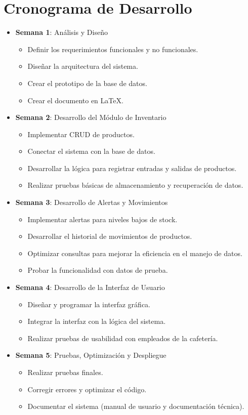 \documentclass{report}
\begin{document}
\section{Cronograma de Desarrollo}
\begin{itemize}
\item \textbf{Semana 1}: Análisis y Diseño
\begin{itemize}
\item Definir los requerimientos funcionales y no funcionales.
\item Diseñar la arquitectura del sistema.
\item Crear el prototipo de la base de datos.
\item Crear el documento en \LaTeX.
\end{itemize}
\item \textbf{Semana 2}: Desarrollo del Módulo de Inventario
\begin{itemize}
\item Implementar CRUD de productos.
\item Conectar el sistema con la base de datos.
\item Desarrollar la lógica para registrar entradas y salidas de productos.
\item Realizar pruebas básicas de almacenamiento y recuperación de datos.
\end{itemize}
\item \textbf{Semana 3}: Desarrollo de Alertas y Movimientos
\begin{itemize}
\item Implementar alertas para niveles bajos de stock.
\item Desarrollar el historial de movimientos de productos.
\item Optimizar consultas para mejorar la eficiencia en el manejo de datos.
\item Probar la funcionalidad con datos de prueba.
\end{itemize}
\item \textbf{Semana 4}: Desarrollo de la Interfaz de Usuario
\begin{itemize}
\item Diseñar y programar la interfaz gráfica.
\item Integrar la interfaz con la lógica del sistema.
\item Realizar pruebas de usabilidad con empleados de la cafetería.
\end{itemize}
\item \textbf{Semana 5}: Pruebas, Optimización y Despliegue
\begin{itemize}
\item Realizar pruebas finales.
\item Corregir errores y optimizar el código.
\item Documentar el sistema (manual de usuario y documentación técnica).
\end{itemize}
\end{itemize}
\end{document}
